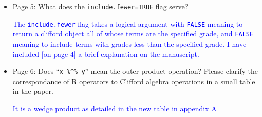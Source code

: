 \documentclass{article}
\begin{document}
\begin{itemize}
\item Page 5: What does the {\tt include.fewer=TRUE} flag serve?

  \textcolor{blue}{The {\tt include.fewer} flag takes a logical
    argument with {\tt FALSE} meaning to return a clifford object all
    of whose terms are the specified grade, and {\tt FALSE} meaning to
    include terms with grades less than the specified grade.  I have
    included [on page 4] a brief explanation on the manuscript.}

\item Page 6: Does ``{\tt x \%\string^\% y}'' mean the outer product
  operation?  Please clarify the correspondance of R operators to
  Clifford algebra operations in a small table in the paper.

  \textcolor{blue}{It is a wedge product as detailed in the new table
    in appendix A}

\end{itemize}
\end{document}
